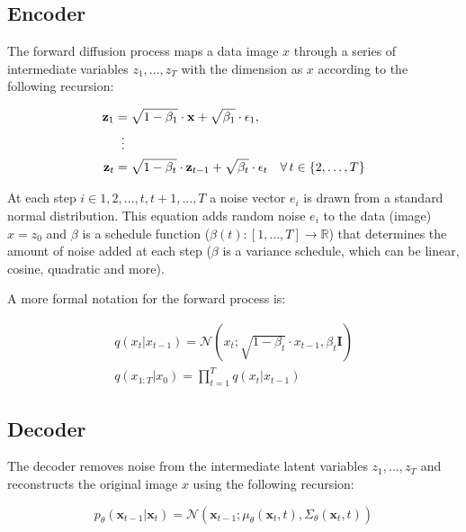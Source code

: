 \subsection{Encoder}

The forward diffusion process maps a data image $x$ through a series of intermediate variables $z_1, ..., z_T$ with the dimension as $x$ according to the following recursion:

\begin{equation}
    \begin{aligned}
    \mathbf{z}_1 &= \sqrt{1 - \beta_1} \cdot \mathbf{x} + \sqrt{\beta_1} \cdot \epsilon_1, \\
    &\;\;\vdots \notag \\
    \mathbf{z}_t &= \sqrt{1 - \beta_t} \cdot \mathbf{z}_{t-1} + \sqrt{\beta_t} \cdot \epsilon_t \quad \forall \, t \in \{2, \ldots, T\}
    \end{aligned}
\end{equation}

At each step $i \in {1, 2, ..., t, t+1, ..., T}$ a noise vector $e_i$ is drawn from a standard normal distribution. This equation adds random noise $e_i$ to the data (image) $x = z_0$ and $\beta$ is a schedule function ($\beta(t):[1, ..., T] \rightarrow \mathbb{R}$) that determines the amount of noise added at each step ($\beta$ is a variance schedule, which can be linear, cosine, quadratic and more). 

A more formal notation for the forward process is:

\begin{equation}
    \begin{aligned}
        q(x_t | x_{t-1}) = \mathcal{N}(x_t; \sqrt{1-\beta_t} \cdot x_{t-1}, \beta_t \mathbf{I}) \\
        q(x_{1:T} | x_0) = \prod_{t=1}^{T} q(x_t | x_{t-1})
    \end{aligned}
\end{equation}








\subsection{Decoder}

The decoder removes noise from the intermediate latent variables $z_1, ..., z_T$ and reconstructs the original image $x$ using the following recursion:

\begin{equation}
    p_\theta(\mathbf{x}_{t-1} | \mathbf{x}_t) = \mathcal{N}(\mathbf{x}_{t-1}; \mu_\theta(\mathbf{x}_t, t), \Sigma_\theta(\mathbf{x}_t, t))
\end{equation}

